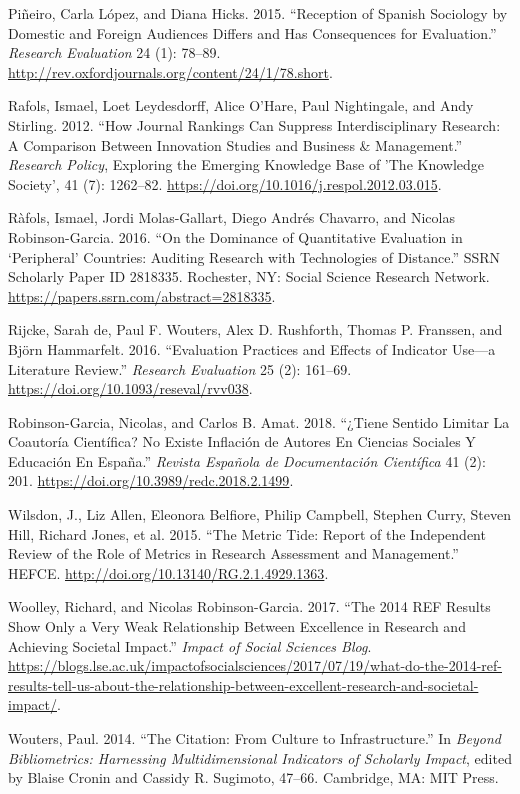 \documentclass[]{elsarticle} %
\begin{document}
\leavevmode\hypertarget{ref-pineiroReceptionSpanishSociology2015}{}%
Piñeiro, Carla López, and Diana Hicks. 2015. ``Reception of Spanish
Sociology by Domestic and Foreign Audiences Differs and Has Consequences
for Evaluation.'' \emph{Research Evaluation} 24 (1): 78--89.
\url{http://rev.oxfordjournals.org/content/24/1/78.short}.

\leavevmode\hypertarget{ref-rafolsHowJournalRankings2012}{}%
Rafols, Ismael, Loet Leydesdorff, Alice O'Hare, Paul Nightingale, and
Andy Stirling. 2012. ``How Journal Rankings Can Suppress
Interdisciplinary Research: A Comparison Between Innovation Studies and
Business \& Management.'' \emph{Research Policy}, Exploring the Emerging
Knowledge Base of 'The Knowledge Society', 41 (7): 1262--82.
\url{https://doi.org/10.1016/j.respol.2012.03.015}.

\leavevmode\hypertarget{ref-rafolsDominanceQuantitativeEvaluation2016}{}%
Ràfols, Ismael, Jordi Molas-Gallart, Diego Andrés Chavarro, and Nicolas
Robinson-Garcia. 2016. ``On the Dominance of Quantitative Evaluation in
`Peripheral' Countries: Auditing Research with Technologies of
Distance.'' SSRN Scholarly Paper ID 2818335. Rochester, NY: Social
Science Research Network.
\url{https://papers.ssrn.com/abstract=2818335}.

\leavevmode\hypertarget{ref-rijckeEvaluationPracticesEffects2016}{}%
Rijcke, Sarah de, Paul F. Wouters, Alex D. Rushforth, Thomas P.
Franssen, and Björn Hammarfelt. 2016. ``Evaluation Practices and Effects
of Indicator Use---a Literature Review.'' \emph{Research Evaluation} 25
(2): 161--69. \url{https://doi.org/10.1093/reseval/rvv038}.

\leavevmode\hypertarget{ref-robinson-garciaTieneSentidoLimitar2018}{}%
Robinson-Garcia, Nicolas, and Carlos B. Amat. 2018. ``¿Tiene Sentido
Limitar La Coautoría Científica? No Existe Inflación de Autores En
Ciencias Sociales Y Educación En España.'' \emph{Revista Española de
Documentación Científica} 41 (2): 201.
\url{https://doi.org/10.3989/redc.2018.2.1499}.

\leavevmode\hypertarget{ref-wilsdonMetricTideReport2015}{}%
Wilsdon, J., Liz Allen, Eleonora Belfiore, Philip Campbell, Stephen
Curry, Steven Hill, Richard Jones, et al. 2015. ``The Metric Tide:
Report of the Independent Review of the Role of Metrics in Research
Assessment and Management.'' HEFCE.
\url{http://doi.org/10.13140/RG.2.1.4929.1363}.

\leavevmode\hypertarget{ref-woolley2014REFResults2017}{}%
Woolley, Richard, and Nicolas Robinson-Garcia. 2017. ``The 2014 REF
Results Show Only a Very Weak Relationship Between Excellence in
Research and Achieving Societal Impact.'' \emph{Impact of Social
Sciences Blog}.
\url{https://blogs.lse.ac.uk/impactofsocialsciences/2017/07/19/what-do-the-2014-ref-results-tell-us-about-the-relationship-between-excellent-research-and-societal-impact/}.

\leavevmode\hypertarget{ref-woutersCitationCultureInfrastructure2014}{}%
Wouters, Paul. 2014. ``The Citation: From Culture to Infrastructure.''
In \emph{Beyond Bibliometrics: Harnessing Multidimensional Indicators of
Scholarly Impact}, edited by Blaise Cronin and Cassidy R. Sugimoto,
47--66. Cambridge, MA: MIT Press.
\end{document}
